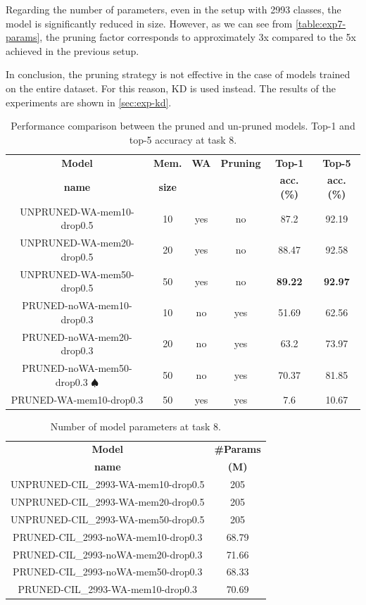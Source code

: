 Regarding the number of parameters, even in the setup with 2993 classes, the model is significantly reduced in size.
However, as we can see from \autoref{table:exp7-params}, the pruning factor corresponds to approximately 3x compared to the 5x achieved in the previous setup.

In conclusion, the pruning strategy is not effective in the case of models trained on the entire dataset.
For this reason, KD is used instead. The results of the experiments are shown in \autoref{sec:exp-kd}.

\begin{table}[H]
    \centering
    \begin{tabular}{c|c|c|c|c|c}
        \hline
        \textbf{Model} &
        \textbf{Mem.} &
        \textbf{WA} &
        \textbf{Pruning} &
        \textbf{Top-1} & 
        \textbf{Top-5} \\
        \textbf{name} &
        \textbf{size} &
        &
        &
        \textbf{acc. (\%)} & 
        \textbf{acc. (\%)} \\
        \hline
        \hline
UNPRUNED-WA-mem10-drop0.5&10&yes&no&87.2&92.19\\
UNPRUNED-WA-mem20-drop0.5&20&yes&no&88.47&92.58\\
UNPRUNED-WA-mem50-drop0.5&50&yes&no&\textbf{89.22}&\textbf{92.97}\\
\hline
PRUNED-noWA-mem10-drop0.3&10&no&yes&51.69&62.56\\
PRUNED-noWA-mem20-drop0.3&20&no&yes&63.2&73.97\\
PRUNED-noWA-mem50-drop0.3 $\spadesuit$&50&no&yes&70.37&81.85\\
\hline
PRUNED-WA-mem10-drop0.3&50&yes&yes&7.6&10.67\\
\hline
\end{tabular}
\caption{Performance comparison between the pruned and un-pruned models. Top-1 and top-5 accuracy at task 8.}
    \label{table:exp7}
\end{table}


\begin{table}[H]
    \centering
    \begin{tabular}{c|c}
        \hline
        \textbf{Model} &
        \textbf{\#Params} \\
        \textbf{name} &
        \textbf{(M)} \\
        \hline
        \hline
UNPRUNED-CIL\_2993-WA-mem10-drop0.5&205\\
UNPRUNED-CIL\_2993-WA-mem20-drop0.5&205\\
UNPRUNED-CIL\_2993-WA-mem50-drop0.5&205\\
\hline
PRUNED-CIL\_2993-noWA-mem10-drop0.3&68.79\\
PRUNED-CIL\_2993-noWA-mem20-drop0.3&71.66\\
PRUNED-CIL\_2993-noWA-mem50-drop0.3&68.33\\
\hline
PRUNED-CIL\_2993-WA-mem10-drop0.3&70.69\\
        \hline
    \end{tabular}
	\caption{Number of model parameters at task 8.}%
    \label{table:exp7-params}
\end{table}

